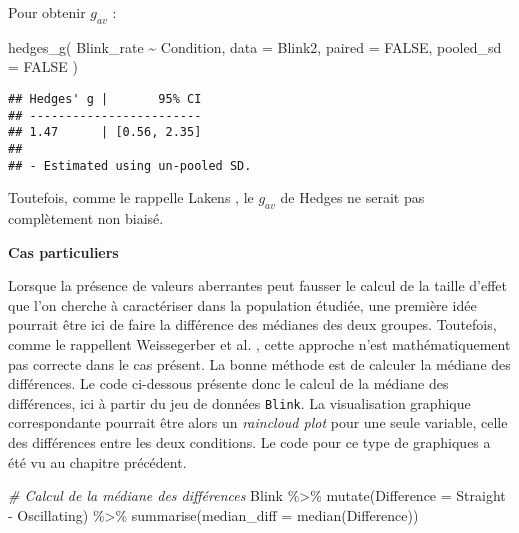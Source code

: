 \documentclass[
]{book}
\newenvironment{Shaded}{\begin{snugshade}}{\end{snugshade}}
\newcommand{\AttributeTok}[1]{\textcolor[rgb]{0.77,0.63,0.00}{#1}}
\newcommand{\CommentTok}[1]{\textcolor[rgb]{0.56,0.35,0.01}{\textit{#1}}}
\newcommand{\ConstantTok}[1]{\textcolor[rgb]{0.00,0.00,0.00}{#1}}
\newcommand{\FunctionTok}[1]{\textcolor[rgb]{0.00,0.00,0.00}{#1}}
\newcommand{\NormalTok}[1]{#1}
\newcommand{\SpecialCharTok}[1]{\textcolor[rgb]{0.00,0.00,0.00}{#1}}
\begin{document}
Pour obtenir \(g_{av}\) :

\begin{Shaded}
\begin{Highlighting}[]
\FunctionTok{hedges\_g}\NormalTok{(}
\NormalTok{  Blink\_rate }\SpecialCharTok{\textasciitilde{}}\NormalTok{ Condition,}
  \AttributeTok{data =}\NormalTok{ Blink2, }
  \AttributeTok{paired =} \ConstantTok{FALSE}\NormalTok{, }
  \AttributeTok{pooled\_sd =} \ConstantTok{FALSE}
\NormalTok{  )}
\end{Highlighting}
\end{Shaded}

\begin{verbatim}
## Hedges' g |       95% CI
## ------------------------
## 1.47      | [0.56, 2.35]
## 
## - Estimated using un-pooled SD.
\end{verbatim}

Toutefois, comme le rappelle Lakens \autocite*{lakensCalculatingReportingEffect2013}, le \(g_{av}\) de Hedges ne serait pas complètement non biaisé.

\textbf{Cas particuliers}

Lorsque la présence de valeurs aberrantes peut fausser le calcul de la taille d'effet que l'on cherche à caractériser dans la population étudiée, une première idée pourrait être ici de faire la différence des médianes des deux groupes. Toutefois, comme le rappellent Weissegerber et al. \autocite*{weissgerberBarLineGraphs2015}, cette approche n'est mathématiquement pas correcte dans le cas présent. La bonne méthode est de calculer la médiane des différences. Le code ci-dessous présente donc le calcul de la médiane des différences, ici à partir du jeu de données \texttt{Blink}. La visualisation graphique correspondante pourrait être alors un \emph{raincloud plot} pour une seule variable, celle des différences entre les deux conditions. Le code pour ce type de graphiques a été vu au chapitre précédent.

\begin{Shaded}
\begin{Highlighting}[]
\CommentTok{\# Calcul de la médiane des différences}
\NormalTok{ Blink }\SpecialCharTok{\%\textgreater{}\%}
  \FunctionTok{mutate}\NormalTok{(}\AttributeTok{Difference =}\NormalTok{ Straight }\SpecialCharTok{{-}}\NormalTok{ Oscillating) }\SpecialCharTok{\%\textgreater{}\%}
  \FunctionTok{summarise}\NormalTok{(}\AttributeTok{median\_diff =} \FunctionTok{median}\NormalTok{(Difference))}
\end{Highlighting}
\end{Shaded}
\end{document}
